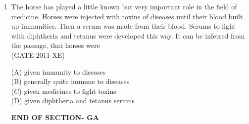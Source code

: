 \documentclass[journal,12pt,onecolumn]{IEEEtran}
\begin{document}
\begin{enumerate}[label=\textbf{Q\arabic*.},itemsep=2em]
\item The horse has played a little known but very important role in the field of medicine. Horses were injected with toxins of diseases until their blood built up immunities. Then a serum was made from their blood. Serums to fight with diphtheria and tetanus were developed this way. It can be inferred from the passage, that horses were \\

\hfill{(GATE 2011 XE)} \\
\begin{multicols}{4}
(A) given immunity to diseases \\
(B) generally quite immune to diseases \\
(C) given medicines to fight toxins \\
(D) given diphtheria and tetanus serums
\end{multicols}


\vspace{3\baselineskip}
    \begin{center}
    \textbf{\Large END OF SECTION- GA}
    \end{center}
    
\end{enumerate}

\clearpage
\end{document}
